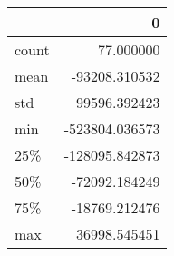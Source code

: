 \begin{tabular}{lr}
\toprule
{} &              0 \\
\midrule
count &      77.000000 \\
mean  &  -93208.310532 \\
std   &   99596.392423 \\
min   & -523804.036573 \\
25\%   & -128095.842873 \\
50\%   &  -72092.184249 \\
75\%   &  -18769.212476 \\
max   &   36998.545451 \\
\bottomrule
\end{tabular}

